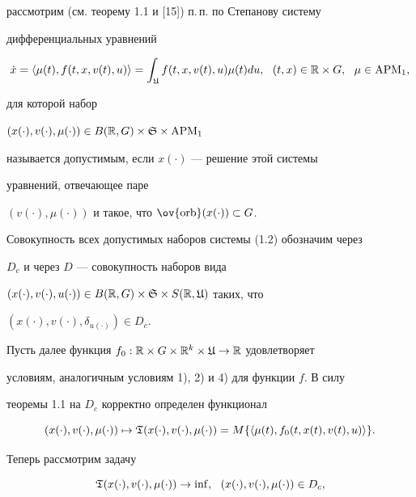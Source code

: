 рассмотрим (см. теорему 1.1 и [15]) п.\,п. по Степанову систему


дифференциальных уравнений


\begin{equation}


\Dot x=\la\mu(t),f(t,x,v(t),u)\ra=\int_{\gU}


f(t,x,v(t),u)\mu(t)du,\ \ (t,x)\in\R\times G,\ \ \mu\in \APM_{1},


\end{equation}


для которой набор


$(x(\cdot), v(\cdot),\mu(\cdot))\in B(\Bbb R,G)\times\frak S\times \operatorname{APM}_{1}$


называется допустимым, если $x(\cdot)$ --- решение этой системы


уравнений, отвечающее паре


$(v(\cdot),\mu(\cdot))$ и такое, что $\ov{\orb}(x(\cdot))\subset G$.





Совокупность всех допустимых наборов системы (1.2) обозначим через


$D_{c}$ и через $D$ --- совокупность наборов вида


$(x(\cdot),v(\cdot),u(\cdot))\in B(\Bbb R,G)\times\frak S\times S(\Bbb R,\frak U)$ таких, что


$(x(\cdot),v(\cdot),\delta_{u(\cdot)})\in D_{c}$.





Пусть далее функция $f_{0}:\Bbb R\times G\times\Bbb R^k\times\frak U\to\Bbb R$ удовлетворяет


условиям, аналогичным условиям 1), 2) и 4) для функции $f$. В силу


теоремы 1.1 на $D_{c}$ корректно определен функционал


$$


(x(\cdot),v(\cdot),\mu(\cdot))\mapsto\gT(x(\cdot),v(\cdot),\mu(\cdot))=


M\{\la\mu(t),f_{0}(t,x(t),v(t),u)\ra\}.


$$





Теперь рассмотрим задачу


\begin{equation}


\gT(x(\cdot),v(\cdot),\mu(\cdot))\to\inf,


\ \ (x(\cdot),v(\cdot),\mu(\cdot))\in D_{c},


\end{equation}



